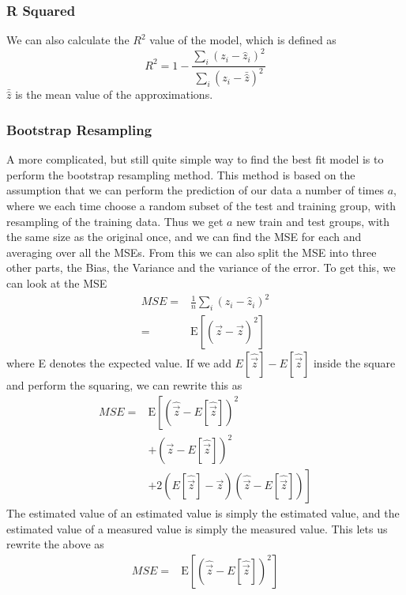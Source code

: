 \documentclass[11pt, A4paper, english]{article}
\begin{document}
\begin{multicols}{2}
				\subsubsection{R Squared}
We can also calculate the $R^2$ value of the model, which is defined as
				\begin{equation}
R^2 = 1 - \frac{\sum_{i} \left( z_i - \hat{z}_i \right)^2}{\sum_{i} \left( z_i - \bar{\hat{z}} \right)^2}
				\end{equation}
$\bar{\hat{z}}$ is the mean value of the approximations. \\
				\subsubsection{Bootstrap Resampling}
A more complicated, but still quite simple way to find the best fit model is to perform the bootstrap resampling method. This method is based on the assumption that we can perform the prediction of our data a number of times $a$, where we each time choose a random subset of the test and training group, with resampling of the training data. Thus we get $a$ new train and test groups, with the same size as the original once, and we can find the MSE for each and averaging over all the MSEs. From this we can also split the MSE into three other parts, the Bias, the Variance and the variance of the error. To get this, we can look at the MSE
				\begin{align*}
MSE =& \frac{1}{n} \sum_{i} \left( z_i - \hat{z}_i \right)^2 \\
=& \text{E}\left[ \left( \vec{z} - \hat{\vec{z}} \right)^2 \right]
				\end{align*}
where E denotes the expected value. If we add $E[\hat{\vec{z}}] - E[\hat{\vec{z}}]$ inside the square and perform the squaring, we can rewrite this as 
				\begin{align*}
MSE =& \text{E}\left[ \left( \hat{\vec{z}} - E[\hat{\vec{z}}] \right)^2 \right. \\
&+ \left( \vec{z} - E[\hat{\vec{z}}] \right)^2 \\
&\left.+ 2 \left( E[\hat{\vec{z}}] - \vec{z} \right) \left( \hat{\vec{z}} - E[\hat{\vec{z}}] \right) \right]
				\end{align*}
The estimated value of an estimated value is simply the estimated value, and the estimated value of a measured value is simply the measured value. This lets us rewrite the above as
				\begin{align*}
MSE =& \text{E}\left[ \left( \hat{\vec{z}} - E[\hat{\vec{z}}] \right)^2 \right] \\

\end{align*}
\end{multicols}
\end{document}
